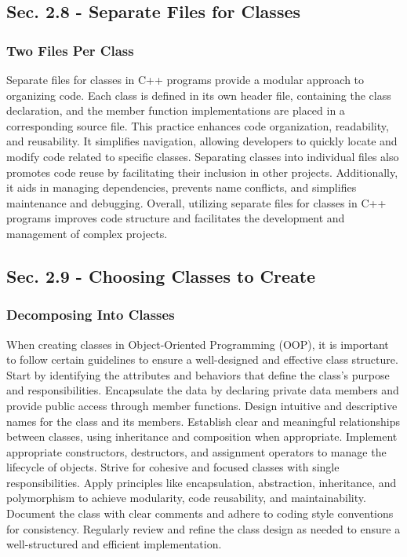 \subsection*{Sec. 2.8 - Separate Files for Classes}
\subsubsection*{Two Files Per Class}

Separate files for classes in C++ programs provide a modular approach to organizing code. Each class is defined in its own header file, containing the class declaration, and the member function implementations are placed in a corresponding source 
file. This practice enhances code organization, readability, and reusability. It simplifies navigation, allowing developers to quickly locate and modify code related to specific classes. Separating classes into individual files also promotes code 
reuse by facilitating their inclusion in other projects. Additionally, it aids in managing dependencies, prevents name conflicts, and simplifies maintenance and debugging. Overall, utilizing separate files for classes in C++ programs improves code 
structure and facilitates the development and management of complex projects.

\subsection*{Sec. 2.9 - Choosing Classes to Create}
\subsubsection*{Decomposing Into Classes}

When creating classes in Object-Oriented Programming (OOP), it is important to follow certain guidelines to ensure a well-designed and effective class structure. Start by identifying the attributes and behaviors that define the class's purpose and 
responsibilities. Encapsulate the data by declaring private data members and provide public access through member functions. Design intuitive and descriptive names for the class and its members. Establish clear and meaningful relationships between 
classes, using inheritance and composition when appropriate. Implement appropriate constructors, destructors, and assignment operators to manage the lifecycle of objects. Strive for cohesive and focused classes with single responsibilities. Apply 
principles like encapsulation, abstraction, inheritance, and polymorphism to achieve modularity, code reusability, and maintainability. Document the class with clear comments and adhere to coding style conventions for consistency. Regularly review 
and refine the class design as needed to ensure a well-structured and efficient implementation.

